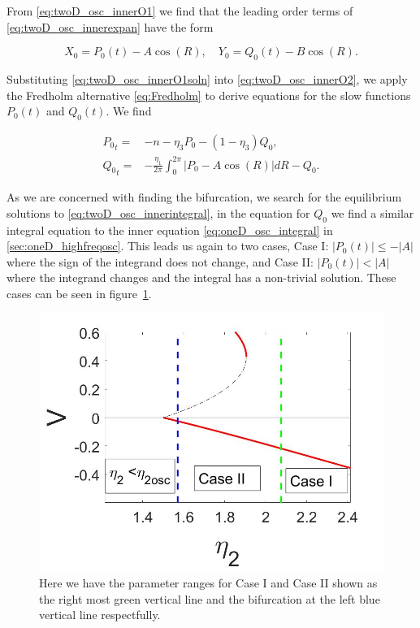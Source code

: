 From \eqref{eq:twoD_osc_innerO1} we find that the leading order terms of \eqref{eq:twoD_osc_innerexpan} have the form 

\begin{equation}\label{eq:twoD_osc_innerO1soln}
X_0=P_0(t)-A\cos(R),\quad Y_0=Q_0(t)-B\cos(R).
\end{equation}
 
Substituting \eqref{eq:twoD_osc_innerO1soln} into \eqref{eq:twoD_osc_innerO2}, we apply the Fredholm alternative \eqref{eq:Fredholm} to derive equations for the slow functions $P_0(t)$ and $Q_0(t)$. We find

\begin{equation}\label{eq:twoD_osc_innerintegral}
\begin{aligned}
{P_0}_t =& -n -\eta_3P_0-(1-\eta_3)Q_0,\\
{Q_0}_t =& -\frac{\eta_1}{2\pi}\int_0^{2\pi}|P_0-A\cos(R)|dR-Q_0.
\end{aligned}
\end{equation}

As we are concerned with finding the bifurcation, we search for the equilibrium solutions to \eqref{eq:twoD_osc_innerintegral}, in the equation for $Q_0$ we find a similar integral equation to the inner equation \eqref{eq:oneD_osc_integral} in \autoref{sec:oneD_highfreqosc}. This leads us again to two cases, Case I: $|P_0(t)|\le -|A|$ where the sign of the integrand does not change, and Case II: $|P_0(t)|<|A|$ where the integrand changes and the integral has a non-trivial solution. These cases can be seen in figure~\ref{fig:twoD_osc_cases}.

\begin{figure}[H]
\centering
\includegraphics[scale=.25]{twoD/osc_cases.jpg}
\caption{Here we have the parameter ranges for Case I and Case II shown as the right most green vertical line and the bifurcation at the left blue vertical line respectfully.}
\label{fig:twoD_osc_cases}
\end{figure}

